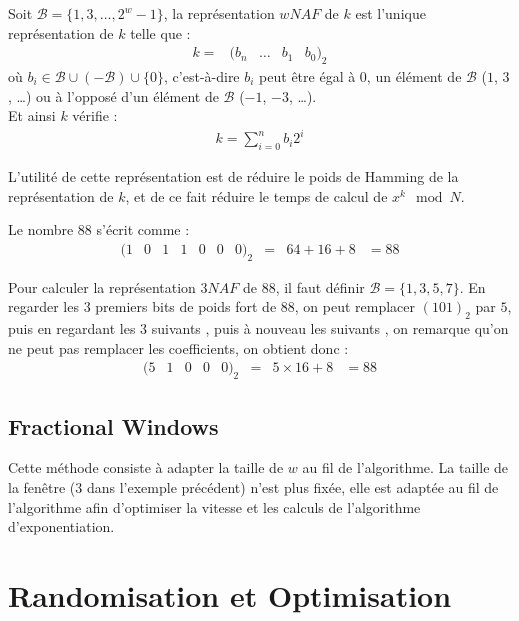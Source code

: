 \documentclass[12pt, a4paper]{memoir}
\begin{document}
Soit $\mathcal{B} = \{1,3,\ldots,2^w - 1\}$, la représentation $wNAF$ de $k$ est l'unique représentation 
de $k$ telle que : 
$$\begin{array}{lcccc}
k = & (b_n & \ldots & b_1 & b_0)_2
\end{array}$$ où $b_i \in \mathcal{B} \cup (-\mathcal{B}) \cup \{0\}$, c'est-à-dire $b_i$ peut être égal à 
$0$, un élément de $\mathcal{B}$ ($1$, $3$ , \ldots) ou à l'opposé d'un élément de $\mathcal{B}$ ($-1$, $-3$, \ldots). \\
Et ainsi $k$ vérifie :
\begin{eqnarray*}
 k = \sum_{i=0}^{n} b_i 2^i
\end{eqnarray*}

L'utilité de cette représentation est de réduire le poids de Hamming de la représentation de $k$, 
et de ce fait réduire le temps de calcul de $x^k \mod N$.

\begin{Exemple}
 Le nombre $88$ s'écrit comme :
  $$\begin{array}{cccccccccc}
  (1 & 0 & 1 & 1 & 0 & 0 & 0)_2 & = & 64 + 16 + 8 & = 88 
 \end{array}$$
 
 Pour calculer la représentation $3NAF$ de $88$, il faut définir $\mathcal{B} = \{1,3,5,7\}$.
 En regarder les $3$ premiers bits de poids fort de $88$, on peut remplacer $(101)_2$ par $5$, 
 puis en regardant les $3$ suivants , puis à nouveau les suivants , on remarque qu'on ne peut pas remplacer 
 les coefficients, on obtient donc :
  $$\begin{array}{cccccccc}
  (5 & 1 & 0 & 0 & 0)_2 & = & 5 \times 16 + 8 & = 88 
 \end{array}$$
\end{Exemple}

\subsection{Fractional Windows}

Cette méthode consiste à adapter la taille de $w$ au fil de l'algorithme.
La taille de la fenêtre ($3$ dans l'exemple précédent) n'est plus fixée, elle est adaptée au fil de l'algorithme
afin d'optimiser la vitesse et les calculs de l'algorithme d'exponentiation.


\section{Randomisation et Optimisation}
\end{document}
